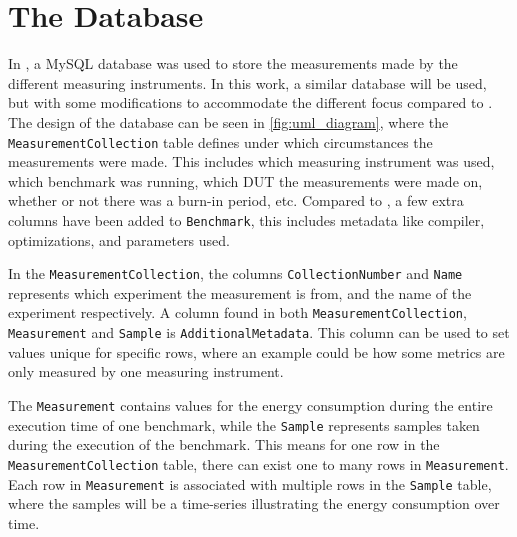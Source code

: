 \section{The Database}\label{app:database}

In \cite{biksbois}, a MySQL database was used to store the measurements made by the different measuring instruments. In this work, a similar database will be used, but with some modifications to accommodate the different focus compared to \cite{biksbois}. The design of the database can be seen in \cref{fig:uml_diagram}, where the \texttt{MeasurementCollection} table defines under which circumstances the measurements were made. This includes which measuring instrument was used, which benchmark was running, which DUT the measurements were made on, whether or not there was a burn-in period, etc. Compared to \cite{biksbois}, a few extra columns have been added to \texttt{Benchmark}, this includes metadata like compiler, optimizations, and parameters used.



In the \texttt{MeasurementCollection}, the columns \texttt{CollectionNumber} and \texttt{Name} represents which experiment the measurement is from, and the name of the experiment respectively. A column found in both \texttt{MeasurementCollection}, \texttt{Measurement} and \texttt{Sample} is \texttt{AdditionalMetadata}. This column can be used to set values unique for specific rows, where an example could be how some metrics are only measured by one measuring instrument.



The \texttt{Measurement} contains values for the energy consumption during the entire execution time of one benchmark, while the \texttt{Sample} represents samples taken during the execution of the benchmark. This means for one row in the \texttt{MeasurementCollection} table, there can exist one to many rows in \texttt{Measurement}. Each row in \texttt{Measurement} is associated with multiple rows in the \texttt{Sample} table, where the samples will be a time-series illustrating the energy consumption over time.

